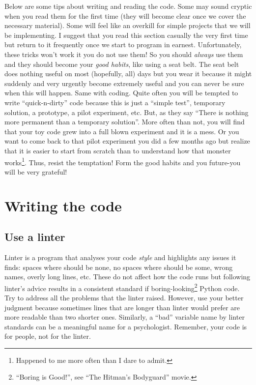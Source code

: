 \documentclass[
]{book}
\begin{document}
Below are some tips about writing and reading the code. Some may sound cryptic when you read them for the first time (they will become clear once we cover the necessary material). Some will feel like an overkill for simple projects that we will be implementing. I suggest that you read this section casually the very first time but return to it frequently once we start to program in earnest. Unfortunately, these tricks won't work it you do not use them! So you should \emph{always} use them and they should become your \emph{good habits}, like using a seat belt. The seat belt does nothing useful on most (hopefully, all) days but you wear it because it might suddenly and very urgently become extremely useful and you can never be sure when this will happen. Same with coding. Quite often you will be tempted to write ``quick-n-dirty'' code because this is just a ``simple test'', temporary solution, a prototype, a pilot experiment, etc. But, as they say ``There is nothing more permanent than a temporary solution''. More often than not, you will find that your toy code grew into a full blown experiment and it is a mess. Or you want to come back to that pilot experiment you did a few months ago but realize that it is easier to start from scratch than to understand how that monster works\footnote{Happened to me more often than I dare to admit.}. Thus, resist the temptation! Form the good habits and you future-you will be very grateful!

\hypertarget{writing-tips}{%
\section{Writing the code}\label{writing-tips}}

\hypertarget{use-a-linter}{%
\subsection{Use a linter}\label{use-a-linter}}

Linter is a program that analyses your code \emph{style} and highlights any issues it finds: spaces where should be none, no spaces where should be some, wrong names, overly long lines, etc. These do not affect how the code runs but following linter's advice results in a consistent standard if boring-looking\footnote{``Boring is Good!'', see ``The Hitman's Bodyguard'' movie.} Python code. Try to address all the problems that the linter raised. However, use your better judgment because sometimes lines that are longer than linter would prefer are more readable than two shorter ones. Similarly, a ``bad'' variable name by linter standards can be a meaningful name for a psychologist. Remember, your code is for people, not for the linter.
\end{document}
